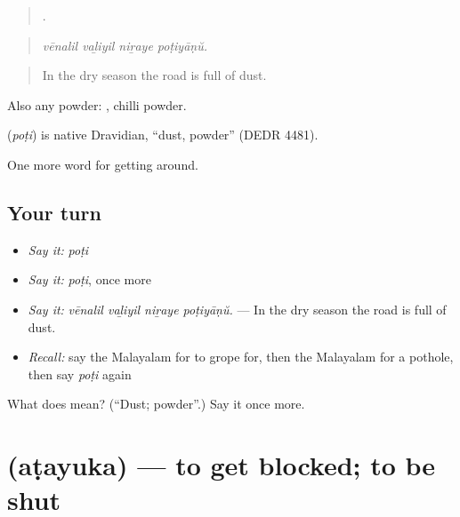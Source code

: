 \begin{quote}
   .
\end{quote}

\begin{quote}
\emph{vēnalil vaḻiyil niṟaye poṭiyāṇŭ.}
\end{quote}

\begin{quote}
In the dry season the road is full of dust.
\end{quote}

Also any powder: , chilli powder.

\begin{cousinweb}
\textbf{} (\emph{poṭi}) is native Dravidian, \textquotedblleft{}dust, powder\textquotedblright{} (DEDR 4481).
\end{cousinweb}

\begin{grammarlens}[title={What you've built}]
One more word for getting around.
\end{grammarlens}

\subsection*{Your turn}
\begin{itemize}
\raggedright
  \item \emph{Say it:} \emph{poṭi}
  \item \emph{Say it:} \emph{poṭi}, once more
  \item \emph{Say it:} \emph{vēnalil vaḻiyil niṟaye poṭiyāṇŭ.} — In the dry season the road is full of dust.
  \item \emph{Recall:} say the Malayalam for to grope for, then the Malayalam for a pothole, then say \emph{poṭi} again
\end{itemize}

\begin{tcolorbox}[breakable,colback=teal!4,colframe=teal!35!black,title={Before you move on}]
What does  mean? (\textquotedblleft{}Dust; powder\textquotedblright{}.) Say it once more.
\end{tcolorbox}
\section[\texorpdfstring{\ml{അടയുക} (aṭayuka)}{അടയുക (aṭayuka)}]{ (aṭayuka) — to get blocked; to be shut}

\label{lesson:ML-C516-atayuka}




